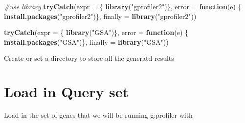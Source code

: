 \documentclass[
]{book}
\newenvironment{Shaded}{\begin{snugshade}}{\end{snugshade}}
\newcommand{\AttributeTok}[1]{\textcolor[rgb]{0.13,0.29,0.53}{#1}}
\newcommand{\CommentTok}[1]{\textcolor[rgb]{0.56,0.35,0.01}{\textit{#1}}}
\newcommand{\ConstantTok}[1]{\textcolor[rgb]{0.56,0.35,0.01}{#1}}
\newcommand{\ControlFlowTok}[1]{\textcolor[rgb]{0.13,0.29,0.53}{\textbf{#1}}}
\newcommand{\FunctionTok}[1]{\textcolor[rgb]{0.13,0.29,0.53}{\textbf{#1}}}
\newcommand{\NormalTok}[1]{#1}
\newcommand{\OtherTok}[1]{\textcolor[rgb]{0.56,0.35,0.01}{#1}}
\newcommand{\SpecialCharTok}[1]{\textcolor[rgb]{0.81,0.36,0.00}{\textbf{#1}}}
\newcommand{\StringTok}[1]{\textcolor[rgb]{0.31,0.60,0.02}{#1}}
\begin{document}
\begin{Shaded}
\begin{Highlighting}[]
\CommentTok{\#use library}
\FunctionTok{tryCatch}\NormalTok{(}\AttributeTok{expr =}\NormalTok{ \{ }\FunctionTok{library}\NormalTok{(}\StringTok{"gprofiler2"}\NormalTok{)\}, }
         \AttributeTok{error =} \ControlFlowTok{function}\NormalTok{(e) \{ }
           \FunctionTok{install.packages}\NormalTok{(}\StringTok{"gprofiler2"}\NormalTok{)\}, }
         \AttributeTok{finally =} \FunctionTok{library}\NormalTok{(}\StringTok{"gprofiler2"}\NormalTok{))}

\FunctionTok{tryCatch}\NormalTok{(}\AttributeTok{expr =}\NormalTok{ \{ }\FunctionTok{library}\NormalTok{(}\StringTok{"GSA"}\NormalTok{)\}, }
         \AttributeTok{error =} \ControlFlowTok{function}\NormalTok{(e) \{ }
           \FunctionTok{install.packages}\NormalTok{(}\StringTok{"GSA"}\NormalTok{)\}, }
         \AttributeTok{finally =} \FunctionTok{library}\NormalTok{(}\StringTok{"GSA"}\NormalTok{))}
\end{Highlighting}
\end{Shaded}

Create or set a directory to store all the generatd results

\begin{Shaded}
\end{Shaded}

\section{Load in Query set}\label{load-in-query-set}

Load in the set of genes that we will be running g:profiler with

\begin{Shaded}
\end{Shaded}
\end{document}
